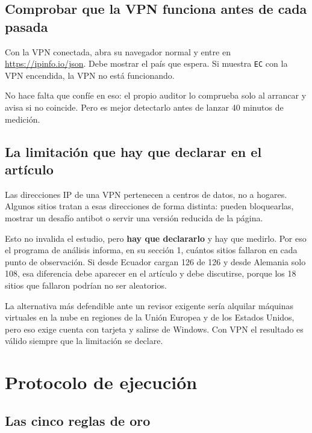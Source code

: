 \documentclass[11pt,a4paper]{article}
\begin{document}
\subsection{Comprobar que la VPN funciona antes de cada pasada}

Con la VPN conectada, abra su navegador normal y entre en \url{https://ipinfo.io/json}. Debe mostrar el país que espera. Si muestra \texttt{EC} con la VPN encendida, la VPN no está funcionando.

No hace falta que confíe en eso: el propio auditor lo comprueba solo al arrancar y avisa si no coincide. Pero es mejor detectarlo antes de lanzar 40 minutos de medición.

\subsection{La limitación que hay que declarar en el artículo}

\begin{aviso}
	Las direcciones IP de una VPN pertenecen a centros de datos, no a hogares. Algunos sitios tratan a esas direcciones de forma distinta: pueden bloquearlas, mostrar un desafío antibot o servir una versión reducida de la página.

	Esto no invalida el estudio, pero \textbf{hay que declararlo} y hay que medirlo. Por eso el programa de análisis informa, en su sección 1, cuántos sitios fallaron en cada punto de observación. Si desde Ecuador cargan 126 de 126 y desde Alemania solo 108, esa diferencia debe aparecer en el artículo y debe discutirse, porque los 18 sitios que fallaron podrían no ser aleatorios.

	La alternativa más defendible ante un revisor exigente sería alquilar máquinas virtuales en la nube en regiones de la Unión Europea y de los Estados Unidos, pero eso exige cuenta con tarjeta y salirse de Windows. Con VPN el resultado es válido siempre que la limitación se declare.
\end{aviso}

\section{Protocolo de ejecución}\label{sec:ejecucion}

\subsection{Las cinco reglas de oro}
\end{document}
